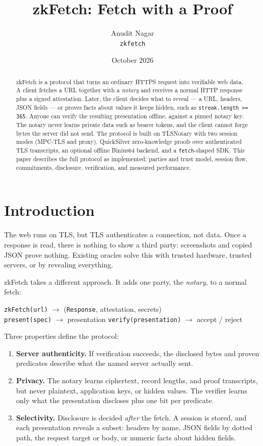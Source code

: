 \documentclass[11pt,a4paper]{article}
\title{zkFetch: Fetch with a Proof}
\author{Anudit Nagar \\ \texttt{zkfetch}}
\date{October 2026}
\begin{document}
\maketitle

\begin{abstract}
\noindent
zkFetch is a protocol that turns an ordinary HTTPS request into verifiable web data.
A client fetches a URL together with a \emph{notary} and receives a normal HTTP response
plus a signed attestation.
Later, the client decides what to reveal --- a URL, headers, JSON fields --- or proves
facts about values it keeps hidden, such as \texttt{streak.length >= 365}.
Anyone can verify the resulting presentation offline, against a pinned notary key.
The notary never learns private data such as bearer tokens, and the client cannot
forge bytes the server did not send.
The protocol is built on TLSNotary with two session modes (MPC-TLS and proxy),
QuickSilver zero-knowledge proofs over authenticated TLS transcripts, an optional
offline Binius64 backend, and a \texttt{fetch}-shaped SDK.
This paper describes the full protocol as implemented: parties and trust model,
session flow, commitments, disclosure, verification, and measured performance.
\end{abstract}

\section{Introduction}

The web runs on TLS, but TLS authenticates a connection, not data.
Once a response is read, there is nothing to show a third party:
screenshots and copied JSON prove nothing.
Existing oracles solve this with trusted hardware, trusted servers, or by
revealing everything.

zkFetch takes a different approach.
It adds one party, the \emph{notary}, to a normal fetch:

\begin{center}
\texttt{zkFetch(url)} $\rightarrow$ (\texttt{Response}, attestation, secrets) \\
\texttt{present(spec)} $\rightarrow$ presentation \qquad
\texttt{verify(presentation)} $\rightarrow$ accept / reject
\end{center}

Three properties define the protocol:

\begin{enumerate}[leftmargin=2em]
\item \textbf{Server authenticity.} If verification succeeds, the disclosed bytes
and proven predicates describe what the named server actually sent.
\item \textbf{Privacy.} The notary learns ciphertext, record lengths, and
proof transcripts, but never plaintext, application keys, or hidden values.
The verifier learns only what the presentation discloses plus one bit per
predicate.
\item \textbf{Selectivity.} Disclosure is decided \emph{after} the fetch.
A session is stored, and each presentation reveals a subset: headers by name,
JSON fields by dotted path, the request target or body, or numeric facts
about hidden fields.
\end{enumerate}
\end{document}
